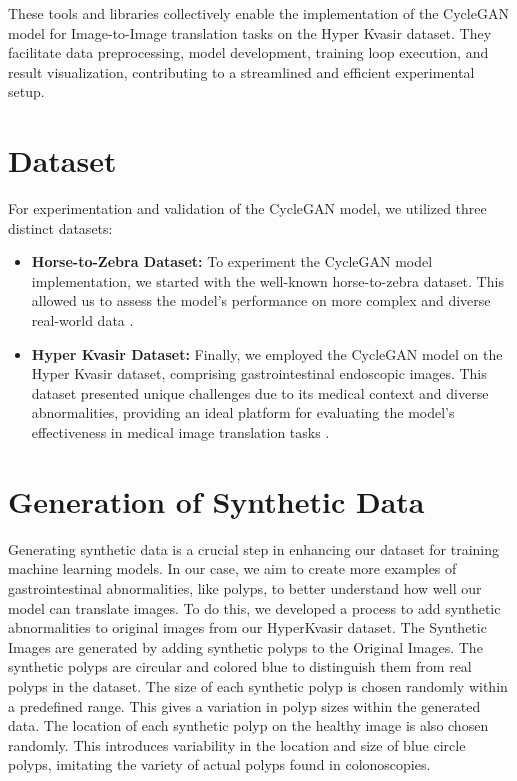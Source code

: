 \documentclass[UKenglish,12pt]{master-style}
\begin{document}
These tools and libraries  \cite{PyTorch_horse2zebra} collectively enable the implementation of the CycleGAN model for Image-to-Image translation tasks on the Hyper Kvasir dataset. They facilitate data preprocessing, model development, training loop execution, and result visualization, contributing to a streamlined and efficient experimental setup.

\section{Dataset}

For experimentation and validation of the CycleGAN model, we utilized three distinct datasets:
\begin{itemize}

\item \textbf{Horse-to-Zebra Dataset: }To experiment the CycleGAN model implementation, we started with the well-known horse-to-zebra dataset. This allowed us to assess the model's performance on more complex and diverse real-world data \cite{PyTorch_horse2zebra}. 

\item \textbf{Hyper Kvasir Dataset:} Finally, we employed the CycleGAN model on the Hyper Kvasir dataset, comprising gastrointestinal endoscopic images. This dataset presented unique challenges due to its medical context and diverse abnormalities, providing an ideal platform for evaluating the model's effectiveness in medical image translation tasks \cite{pytorch_hyperkvasir}. 

\end{itemize}

\section{Generation of Synthetic Data}

Generating synthetic data is a crucial step in enhancing our dataset for training machine learning models. In our case, we aim to create more examples of gastrointestinal abnormalities, like polyps, to better understand how well our model can translate images. To do this, we developed a process to add synthetic abnormalities to original images from our HyperKvasir dataset. The Synthetic Images are generated by adding synthetic polyps to the Original Images. The synthetic polyps are circular and colored blue to distinguish them from real polyps in the dataset. The size of each synthetic polyp is chosen randomly within a predefined range. This gives a variation in polyp sizes within the generated data. The location of each synthetic polyp on the healthy image is also chosen randomly. This introduces variability in the location and size of blue circle polyps, imitating the variety of actual polyps found in colonoscopies.
\end{document}
